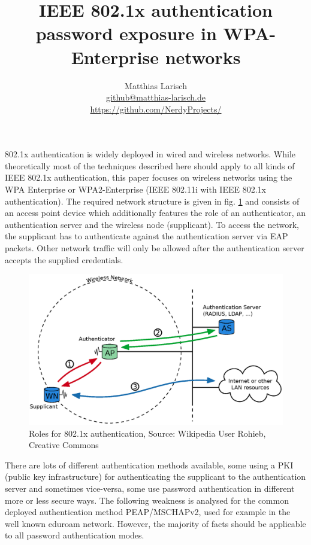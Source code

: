 \documentclass[12pt,a4paper]{scrartcl}
\author{Matthias Larisch\\\url{github@matthias-larisch.de}\\\url{https://github.com/NerdyProjects/}}
\title{IEEE 802.1x authentication password exposure in WPA-Enterprise networks}
\begin{document}
\maketitle
802.1x authentication is widely deployed in wired and wireless networks. While theoretically most of the techniques described here should apply to all kinds of IEEE 802.1x authentication, this paper focuses on wireless networks using the WPA Enterprise or WPA2-Enterprise (IEEE 802.11i with IEEE 802.1x authentication).
The required network structure is given in fig. \ref{f:wpa-eap-structure} and consists of an access point device which additionally features the role of an authenticator, an authentication server and the wireless node (supplicant).
To access the network, the supplicant has to authenticate against the authentication server via EAP packets. Other network traffic will only be allowed after the authentication server accepts the supplied credentials.

\begin{figure}
  \includegraphics[width=\textwidth]{8021x}
  \caption{Roles for 802.1x authentication, Source: Wikipedia User Rohieb, Creative Commons}
  \label{f:wpa-eap-structure}
\end{figure}
There are lots of different authentication methods available, some using a PKI (public key infrastructure) for authenticating the supplicant to the authentication server and sometimes vice-versa, some use password authentication in different more or less secure ways.
The following weakness is analysed for the common deployed authentication method PEAP/MSCHAPv2, used for example in the well known eduroam network. However, the majority of facts should be applicable to all password authentication modes.
\end{document}
